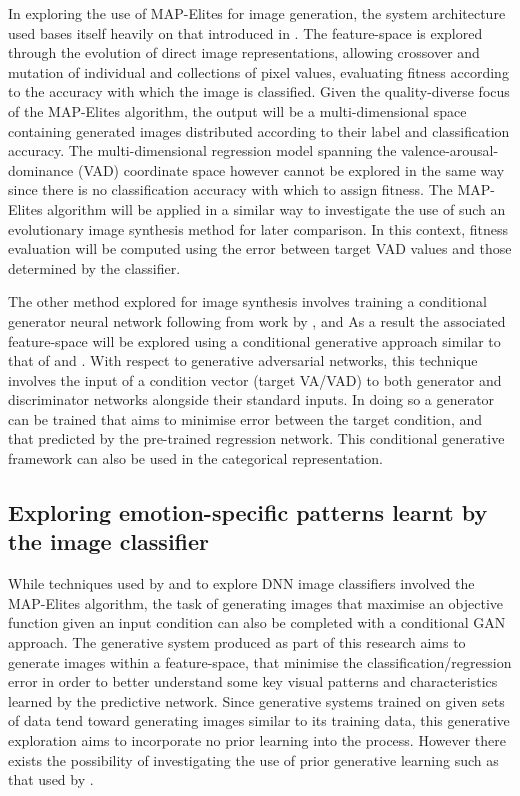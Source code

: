\documentclass{article}
\begin{document}
In exploring the use of MAP-Elites for image generation, the system architecture used bases itself heavily on that introduced in \citet{nguyen2015innovation}.
The feature-space is explored through the evolution of direct image representations, allowing crossover and mutation of individual and collections of pixel values, evaluating fitness according to the accuracy with which the image is classified.
Given the quality-diverse focus of the MAP-Elites algorithm, the output will be a multi-dimensional space containing generated images distributed according to their label and classification accuracy.
The multi-dimensional regression model spanning the valence-arousal-dominance (VAD) coordinate space however cannot be explored in the same way since there is no classification accuracy with which to assign fitness.
The MAP-Elites algorithm will be applied in a similar way to investigate the use of such an evolutionary image synthesis method for later comparison.
In this context, fitness evaluation will be computed using the error between target VAD values and those determined by the classifier.

The other method explored for image synthesis involves training a conditional generator neural network following from work by \citet{tan2017artgan}, and 
As a result the associated feature-space will be explored using a conditional generative approach similar to that of \citet{tan2017artgan} and \citet{gauthier2014conditional}.
With respect to generative adversarial networks, this technique involves the input of a condition vector (target VA/VAD) to both generator and discriminator networks alongside their standard inputs.
In doing so a generator can be trained that aims to minimise error between the target condition, and that predicted by the pre-trained regression network.
This conditional generative framework can also be used in the categorical representation.

\subsection{Exploring emotion-specific patterns learnt by the image classifier}

While techniques used by \citet{nguyen2015deep} and \citet{nguyen2015innovation} to explore DNN image classifiers involved the MAP-Elites algorithm, the task of generating images that maximise an objective function given an input condition can also be completed with a conditional GAN approach.
The generative system produced as part of this research aims to generate images within a feature-space, that minimise the classification/regression error in order to better understand some key visual patterns and characteristics learned by the predictive network.
Since generative systems trained on given sets of data tend toward generating images similar to its training data, this generative exploration aims to incorporate no prior learning into the process.
However there exists the possibility of investigating the use of prior generative learning such as that used by \citet{nguyen2016synthesizing}.
\end{document}

